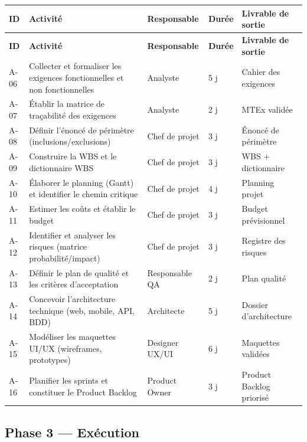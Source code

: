 \documentclass[11pt,a4paper]{article}
\begin{document}
\begin{longtable}{|p{1.2cm}|p{5.5cm}|p{2.2cm}|p{2cm}|p{2.5cm}|}
    \hline
    \rowcolor{ifrigray}
    \textbf{ID} & \textbf{Activité} & \textbf{Responsable} & \textbf{Durée} & \textbf{Livrable de sortie} \\
    \hline
    \endfirsthead
    \hline
    \rowcolor{ifrigray}
    \textbf{ID} & \textbf{Activité} & \textbf{Responsable} & \textbf{Durée} & \textbf{Livrable de sortie} \\
    \hline
    \endhead

    A-06 & Collecter et formaliser les exigences fonctionnelles et non fonctionnelles & Analyste & 5 j & Cahier des exigences \\
    \hline
    A-07 & Établir la matrice de traçabilité des exigences & Analyste & 2 j & MTEx validée \\
    \hline
    A-08 & Définir l'énoncé de périmètre (inclusions/exclusions) & Chef de projet & 3 j & Énoncé de périmètre \\
    \hline
    A-09 & Construire la WBS et le dictionnaire WBS & Chef de projet & 3 j & WBS + dictionnaire \\
    \hline
    A-10 & Élaborer le planning (Gantt) et identifier le chemin critique & Chef de projet & 4 j & Planning projet \\
    \hline
    A-11 & Estimer les coûts et établir le budget & Chef de projet & 3 j & Budget prévisionnel \\
    \hline
    A-12 & Identifier et analyser les risques (matrice probabilité/impact) & Chef de projet & 3 j & Registre des risques \\
    \hline
    A-13 & Définir le plan de qualité et les critères d'acceptation & Responsable QA & 2 j & Plan qualité \\
    \hline
    A-14 & Concevoir l'architecture technique (web, mobile, API, BDD) & Architecte & 5 j & Dossier d'architecture \\
    \hline
    A-15 & Modéliser les maquettes UI/UX (wireframes, prototypes) & Designer UX/UI & 6 j & Maquettes validées \\
    \hline
    A-16 & Planifier les sprints et constituer le Product Backlog & Product Owner & 3 j & Product Backlog priorisé \\
    \hline
\end{longtable}

\subsection{Phase 3 --- Exécution}
\end{document}
